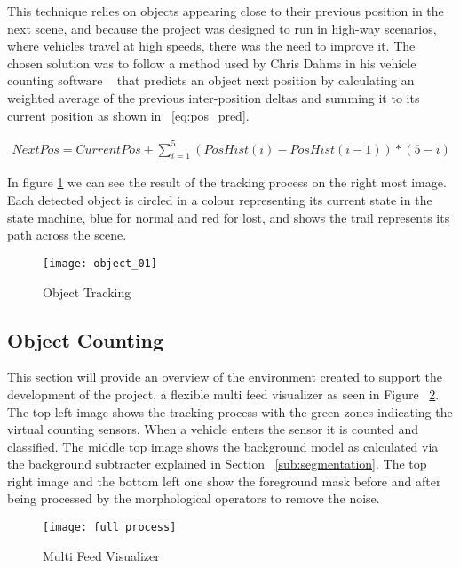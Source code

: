 This technique relies on objects appearing close to their previous position in the next scene, and because the project was designed to run in high-way scenarios, where vehicles travel at high speeds, there was the need to improve it. The chosen solution was to follow a method used by Chris Dahms in his vehicle counting software ~\cite{dahms_opencv_3_car_counting_cpp_2017} that predicts an object next position by calculating an weighted average of the previous inter-position deltas and summing it to its current position as shown in ~\ref{eq:pos_pred}.

\begin{eqnarray}
\label{eq:pos_pred}
NextPos = CurrentPos + \sum_{i=1}^{5} (PosHist(i) - PosHist(i-1)) * (5-i)
\end{eqnarray}

In figure \ref{fig:object_tracking} we can see the result of the tracking process on the right most image. Each detected object is circled in a colour representing its current state in the state machine, blue for normal and red for lost, and shows the trail represents its path across the scene. 

\begin{figure}[h]
  \begin{center}
    \leavevmode
    \texttt{[image: object\_01]}
    \caption{Object Tracking}
    \label{fig:object_tracking}
  \end{center}
\end{figure}

\subsection{Object Counting}

This section will provide an overview of the environment created to support the development of the project, a flexible multi feed visualizer as seen in Figure ~\ref{fig:mfeed}. The top-left image shows the tracking process with the green zones indicating the virtual counting sensors. When a vehicle enters the sensor it is counted and classified. The middle top image shows the background model as calculated via the background subtracter explained in Section ~\ref{sub:segmentation}. The top right image and the bottom left one show the foreground mask before and after being processed by the morphological operators to remove the noise.

\begin{figure}[h]
  \begin{center}
    \leavevmode
    \texttt{[image: full\_process]}
    \caption{Multi Feed Visualizer}
    \label{fig:mfeed}
  \end{center}
\end{figure}

